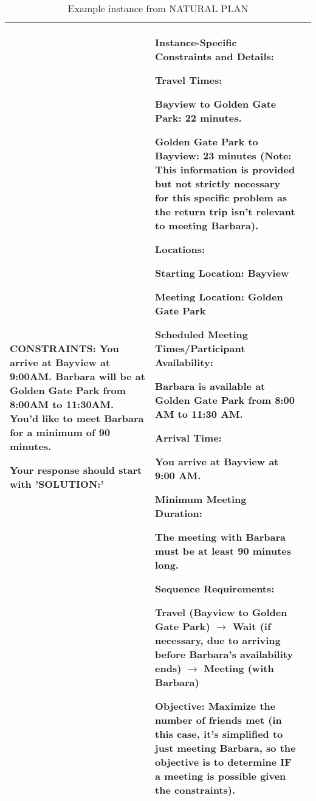 \begin{table*}
\begin{tabularx}{\textwidth}{>{\raggedright}p{}|X|X}
CONSTRAINTS: You arrive at Bayview at 9:00AM. Barbara will be at Golden Gate Park from 8:00AM to 11:30AM. You'd like to meet Barbara for a minimum of 90 minutes.

Your response should start with 'SOLUTION:'

&  

Instance-Specific Constraints and Details:

Travel Times:
    
    Bayview to Golden Gate Park: 22 minutes.
    
    Golden Gate Park to Bayview: 23 minutes (Note: This information is provided but not strictly necessary for this specific problem as the return trip isn't relevant to meeting Barbara).

Locations:
    
    Starting Location: Bayview
    
    Meeting Location: Golden Gate Park

Scheduled Meeting Times/Participant Availability:
    
    Barbara is available at Golden Gate Park from 8:00 AM to 11:30 AM.

Arrival Time:
    
    You arrive at Bayview at 9:00 AM.

Minimum Meeting Duration:
    
    The meeting with Barbara must be at least 90 minutes long.

Sequence Requirements:
    
    Travel (Bayview to Golden Gate Park) $\rightarrow$ Wait (if necessary, due to arriving before Barbara's availability ends) $\rightarrow$ Meeting (with Barbara)

Objective: Maximize the number of friends met (in this case, it's simplified to just meeting Barbara, so the objective is to determine IF a meeting is possible given the constraints). 

\\ \bottomrule
\end{tabularx}

\caption{Example instance from NATURAL PLAN}
\label{tab:reasoning_constraints_examples}
\end{table*}